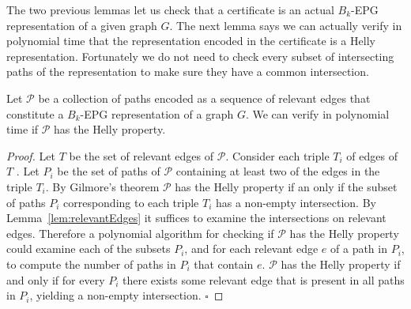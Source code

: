 \documentclass[runningheads]{llncs}
\begin{document}
The two previous lemmas let us check that a certificate is an actual $B_k$-EPG representation of a given graph $G$.  The next lemma says we can actually verify in polynomial time that the representation encoded in the certificate is a Helly representation. Fortunately we do not need to check every subset of intersecting paths  of the representation to make sure they have a common intersection. 


\begin{lemma}\label{lem:verify3}
Let $\mathcal{P}$ be a collection of paths encoded as a sequence of relevant edges that constitute a  $B_k$-EPG representation of a graph $G$. We can verify in polynomial time if $\mathcal{P}$ has the Helly property.
\end{lemma}

\begin{proof}
Let $T$ be the set of relevant edges of $\mathcal{P}$. Consider each triple $T_i$ of edges of $T$ . Let $P_i$ be the set of paths of $\mathcal{P}$ containing at least two of the edges in the triple  $T_i$. By Gilmore’s theorem \cite{bergeDuchet1975} $\mathcal{P}$ has the Helly property if an only if the subset of paths $P_i$  corresponding to each triple  $T_i$  has a non-empty intersection.  By Lemma~\ref{lem:relevantEdges} it suffices to examine the intersections on relevant edges. Therefore a polynomial algorithm for checking if $\mathcal{P}$ has the Helly property could examine each of the subsets $P_i$, and for each relevant edge $e$ of a path in $P_i$, to compute the number of paths in $P_i$ that contain $e$. $\mathcal{P}$ has the Helly property if and only if for every  $P_i$  there exists some relevant edge that is present in all paths in $P_i$,  yielding a non-empty intersection.
$\square$ \end{proof}
\end{document}
